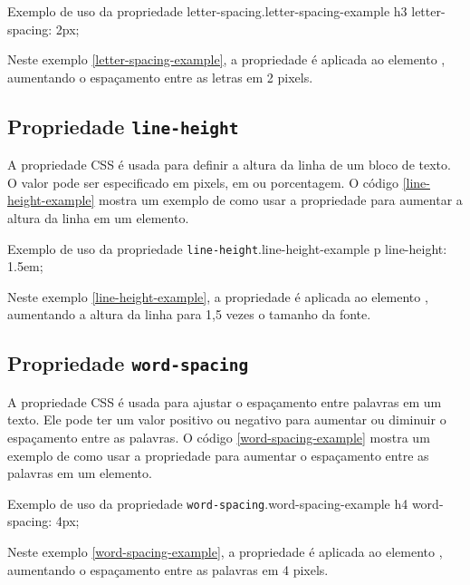 \begin{csscode}{Exemplo de uso da propriedade letter-spacing.}{letter-spacing-example}
h3 {
    letter-spacing: 2px;
}
\end{csscode}

Neste exemplo \ref{letter-spacing-example}, a propriedade  é aplicada ao elemento , aumentando o espaçamento entre as letras em 2 pixels.

\subsection{Propriedade \texttt{line-height}}

A propriedade CSS  é usada para definir a altura da linha de um bloco de texto. O valor pode ser especificado em pixels, em ou porcentagem. O código \ref{line-height-example} mostra um exemplo de como usar a propriedade  para aumentar a altura da linha em um elemento.

\begin{csscode}{Exemplo de uso da propriedade \texttt{line-height}.}{line-height-example}
p {
    line-height: 1.5em;
}
\end{csscode}

Neste exemplo \ref{line-height-example}, a propriedade  é aplicada ao elemento , aumentando a altura da linha para 1,5 vezes o tamanho da fonte.

\subsection{Propriedade \texttt{word-spacing}}

A propriedade CSS  é usada para ajustar o espaçamento entre palavras em um texto. Ele pode ter um valor positivo ou negativo para aumentar ou diminuir o espaçamento entre as palavras. O código \ref{word-spacing-example} mostra um exemplo de como usar a propriedade  para aumentar o espaçamento entre as palavras em um elemento.

\begin{csscode}{Exemplo de uso da propriedade \texttt{word-spacing}.}{word-spacing-example}
h4 {
    word-spacing: 4px;
}
\end{csscode}

Neste exemplo \ref{word-spacing-example}, a propriedade  é aplicada ao elemento , aumentando o espaçamento entre as palavras em 4 pixels.

